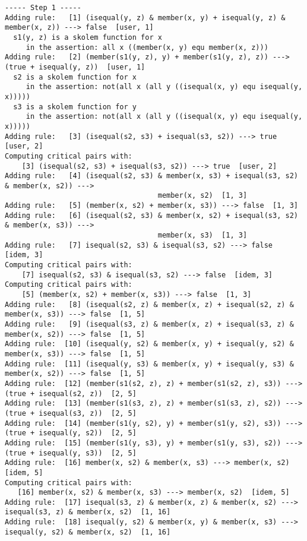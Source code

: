 \begin{verbatim}
----- Step 1 -----
Adding rule:   [1] (isequal(y, z) & member(x, y) + isequal(y, z) & member(x, z)) ---> false  [user, 1]
  s1(y, z) is a skolem function for x
     in the assertion: all x ((member(x, y) equ member(x, z)))
Adding rule:   [2] (member(s1(y, z), y) + member(s1(y, z), z)) ---> (true + isequal(y, z))  [user, 1]
  s2 is a skolem function for x
     in the assertion: not(all x (all y ((isequal(x, y) equ isequal(y, x)))))
  s3 is a skolem function for y
     in the assertion: not(all x (all y ((isequal(x, y) equ isequal(y, x)))))
Adding rule:   [3] (isequal(s2, s3) + isequal(s3, s2)) ---> true  [user, 2]
Computing critical pairs with: 
    [3] (isequal(s2, s3) + isequal(s3, s2)) ---> true  [user, 2]
Adding rule:   [4] (isequal(s2, s3) & member(x, s3) + isequal(s3, s2) & member(x, s2)) ---> 
                                    member(x, s2)  [1, 3]
Adding rule:   [5] (member(x, s2) + member(x, s3)) ---> false  [1, 3]
Adding rule:   [6] (isequal(s2, s3) & member(x, s2) + isequal(s3, s2) & member(x, s3)) --->  
                                    member(x, s3)  [1, 3]
Adding rule:   [7] isequal(s2, s3) & isequal(s3, s2) ---> false  [idem, 3]
Computing critical pairs with: 
    [7] isequal(s2, s3) & isequal(s3, s2) ---> false  [idem, 3]
Computing critical pairs with: 
    [5] (member(x, s2) + member(x, s3)) ---> false  [1, 3]
Adding rule:   [8] (isequal(s2, z) & member(x, z) + isequal(s2, z) & member(x, s3)) ---> false  [1, 5]
Adding rule:   [9] (isequal(s3, z) & member(x, z) + isequal(s3, z) & member(x, s2)) ---> false  [1, 5]
Adding rule:  [10] (isequal(y, s2) & member(x, y) + isequal(y, s2) & member(x, s3)) ---> false  [1, 5]
Adding rule:  [11] (isequal(y, s3) & member(x, y) + isequal(y, s3) & member(x, s2)) ---> false  [1, 5]
Adding rule:  [12] (member(s1(s2, z), z) + member(s1(s2, z), s3)) ---> (true + isequal(s2, z))  [2, 5]
Adding rule:  [13] (member(s1(s3, z), z) + member(s1(s3, z), s2)) ---> (true + isequal(s3, z))  [2, 5]
Adding rule:  [14] (member(s1(y, s2), y) + member(s1(y, s2), s3)) ---> (true + isequal(y, s2))  [2, 5]
Adding rule:  [15] (member(s1(y, s3), y) + member(s1(y, s3), s2)) ---> (true + isequal(y, s3))  [2, 5]
Adding rule:  [16] member(x, s2) & member(x, s3) ---> member(x, s2)  [idem, 5]
Computing critical pairs with: 
   [16] member(x, s2) & member(x, s3) ---> member(x, s2)  [idem, 5]
Adding rule:  [17] isequal(s3, z) & member(x, z) & member(x, s2) ---> isequal(s3, z) & member(x, s2)  [1, 16]
Adding rule:  [18] isequal(y, s2) & member(x, y) & member(x, s3) ---> isequal(y, s2) & member(x, s2)  [1, 16]

\end{verbatim}
